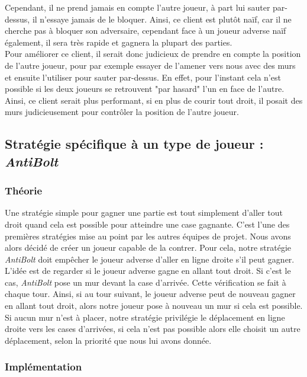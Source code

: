 \documentclass[11pt]{article}
\begin{document}
Cependant, il ne prend jamais en compte l'autre joueur, à part lui sauter par-dessus, il n'essaye jamais de le bloquer. Ainsi, ce client est plutôt naïf, car il ne cherche pas à bloquer son adversaire, cependant face à un joueur adverse naïf également, il sera très rapide et gagnera la plupart des parties. \\

Pour améliorer ce client, il serait donc judicieux de prendre en compte la position de l'autre joueur, pour par exemple essayer de l'amener vers nous avec des murs et ensuite l'utiliser pour sauter par-dessus. En effet, pour l'instant cela n'est possible si les deux joueurs se retrouvent "par hasard" l'un en face de l'autre. Ainsi, ce client serait plus performant, si en plus de courir tout droit, il posait des murs judicieusement pour contrôler la position de l'autre joueur.

\subsection{Stratégie spécifique à un type de joueur : \textit{AntiBolt}}

\subsubsection{Théorie}

Une stratégie simple pour gagner une partie est tout simplement d'aller tout droit quand cela est possible pour atteindre une case gagnante. C'est l'une des premières stratégies mise au point par les autres équipes de projet. Nous avons alors décidé de créer un joueur capable de la contrer. Pour cela, notre stratégie \textit{AntiBolt} doit empêcher le joueur adverse d'aller en ligne droite s'il peut gagner. L'idée est de regarder si le joueur adverse gagne en allant tout droit. Si c'est le cas, \textit{AntiBolt} pose un mur devant la case d'arrivée. Cette vérification se fait à chaque tour. Ainsi, si au tour suivant, le joueur adverse peut de nouveau gagner en allant tout droit, alors notre joueur pose à nouveau un mur si cela est possible. Si aucun mur n'est à placer, notre stratégie privilégie le déplacement en ligne droite vers les cases d'arrivées, si cela n'est pas possible alors elle choisit un autre déplacement, selon la priorité que nous lui avons donnée.

\subsubsection{Implémentation}
\end{document}
